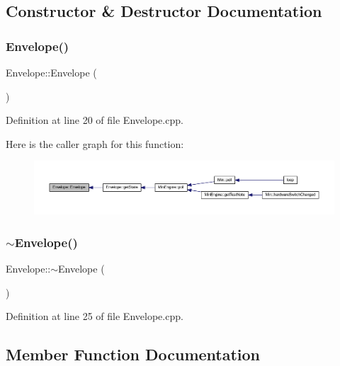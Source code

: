 \subsection{Constructor \& Destructor Documentation}
\mbox{\label{class_envelope_ac609dfa5fe79dd719530e8c29bb35725}} 
\subsubsection{\texorpdfstring{Envelope()}{Envelope()}}
{\footnotesize\ttfamily Envelope\+::\+Envelope (\begin{DoxyParamCaption}{ }\end{DoxyParamCaption})}



Definition at line 20 of file Envelope.\+cpp.

Here is the caller graph for this function\+:
\nopagebreak
\begin{figure}[H]
\begin{center}
\leavevmode
\includegraphics[width=350pt]{d7/df3/class_envelope_ac609dfa5fe79dd719530e8c29bb35725_icgraph}
\end{center}
\end{figure}
\mbox{\label{class_envelope_a0d854766d1fc084d27ddb7b6cf7967af}} 
\subsubsection{\texorpdfstring{$\sim$\+Envelope()}{~Envelope()}}
{\footnotesize\ttfamily Envelope\+::$\sim$\+Envelope (\begin{DoxyParamCaption}{ }\end{DoxyParamCaption})}



Definition at line 25 of file Envelope.\+cpp.



\subsection{Member Function Documentation}
\mbox{\label{class_envelope_ac1cf99747551ea56b1202844da4fddde}} 
